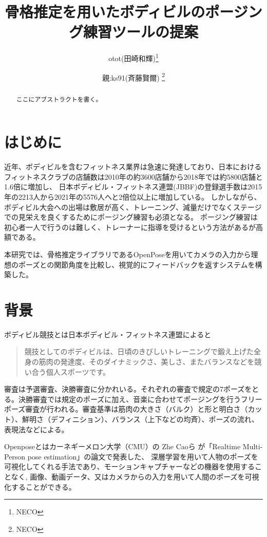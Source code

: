 \documentclass[a4j,10pt]{jsarticle}
\begin{document}

\title{骨格推定を用いたボディビルのポージング練習ツールの提案}

\author{
    otot(田崎和輝)\thanks{NECO}
    \and
    親:ks91(斉藤賢爾) \thanks{NECO}
}

\begin{abstract}
ここにアブストラクトを書く。
\end{abstract}

\maketitle
\thispagestyle{empty}

\section{はじめに}
近年、ボディビルを含むフィットネス業界は急速に発達しており、日本におけるフィットネスクラブの店舗数は2010年の約3600店舗から2018年では約5800店舗と1.6倍に増加し\cite{fitness}、
日本ボディビル・フィットネス連盟(JBBF)の登録選手数は2015年の2213人から2021年の5576人へと2倍位以上に増加している\cite{jbbf}。
しかしながら、ボディビル大会への出場は敷居が高く、トレーニング、減量だけでなくステージでの見栄えを良くするためにポージング練習も必須となる。
ポージング練習は初心者一人で行うのは難しく、トレーナーに指導を受けるという方法があるが高額である。

本研究では、骨格推定ライブラリであるOpenPoseを用いてカメラの入力から理想のポーズとの関節角度を比較し、視覚的にフィードバックを返すシステムを構築した。
\section{背景}
ボディビル競技とは日本ボディビル・フィットネス連盟によると
\begin{quote}
    競技としてのボディビルは、日頃のきびしいトレーニングで鍛え上げた全身の筋肉の発達度、そのダイナミックさ、美しさ、またバランスなどを競い合う個人スポーツです。\cite{bodybuilding}
\end{quote}
審査は予選審査、決勝審査に分かれいる。それぞれの審査で規定の7ポーズをとる。決勝審査では規定のポーズに加え、音楽に合わせてポージングを行うフリーポーズ審査が行われる。審査基準は筋肉の大きさ（バルク）と形と明白さ（カット）、鮮明さ（デフィニション）、バランス（上下などの均斉）、ポーズの流れ、表現法などによる。

Openposeとはカーネギーメロン大学（CMU）の Zhe Caoら が「Realtime Multi-Person pose estimation」\cite{openpose}の論文で発表した、
深層学習を用いて人物のポーズを可視化してくれる手法であり、モーションキャプチャーなどの機器を使用することなく,
画像、動画データ、又はカメラからの入力を用いて人間のポーズを可視化することができる。
\end{document}
